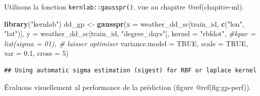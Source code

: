 \documentclass[]{book}
\newenvironment{Shaded}{\begin{snugshade}}{\end{snugshade}}
\newcommand{\CommentTok}[1]{\textcolor[rgb]{0.56,0.35,0.01}{\textit{#1}}}
\newcommand{\DataTypeTok}[1]{\textcolor[rgb]{0.13,0.29,0.53}{#1}}
\newcommand{\DecValTok}[1]{\textcolor[rgb]{0.00,0.00,0.81}{#1}}
\newcommand{\FloatTok}[1]{\textcolor[rgb]{0.00,0.00,0.81}{#1}}
\newcommand{\KeywordTok}[1]{\textcolor[rgb]{0.13,0.29,0.53}{\textbf{#1}}}
\newcommand{\NormalTok}[1]{#1}
\newcommand{\OperatorTok}[1]{\textcolor[rgb]{0.81,0.36,0.00}{\textbf{#1}}}
\newcommand{\OtherTok}[1]{\textcolor[rgb]{0.56,0.35,0.01}{#1}}
\newcommand{\StringTok}[1]{\textcolor[rgb]{0.31,0.60,0.02}{#1}}
\begin{document}
Utilisons la fonction \texttt{kernlab::gausspr()}, vue au chapitre
@ref(chapitre-ml).

\begin{Shaded}
\begin{Highlighting}[]
\KeywordTok{library}\NormalTok{(}\StringTok{"kernlab"}\NormalTok{)}
\NormalTok{dd_gp <-}\StringTok{ }\KeywordTok{gausspr}\NormalTok{(}\DataTypeTok{x =}\NormalTok{ weather_dd_sc[train_id, }\KeywordTok{c}\NormalTok{(}\StringTok{"lon"}\NormalTok{, }\StringTok{"lat"}\NormalTok{)],}
                 \DataTypeTok{y =}\NormalTok{ weather_dd_sc[train_id, }\StringTok{"degree_days"}\NormalTok{],}
                 \DataTypeTok{kernel =} \StringTok{"rbfdot"}\NormalTok{,}
                 \CommentTok{#kpar = list(sigma = 01), # laisser optimiser}
                 \DataTypeTok{variance.model =} \OtherTok{TRUE}\NormalTok{,}
                 \DataTypeTok{scale =} \OtherTok{TRUE}\NormalTok{,}
                 \DataTypeTok{var =} \FloatTok{0.1}\NormalTok{,}
                 \DataTypeTok{cross =} \DecValTok{5}\NormalTok{)}
\end{Highlighting}
\end{Shaded}

\begin{verbatim}
## Using automatic sigma estimation (sigest) for RBF or laplace kernel
\end{verbatim}

Évaluons visuellement al performance de la prédiction (figure
@ref(fig:gp-perf)).

\begin{Shaded}
\end{Shaded}
\end{document}
